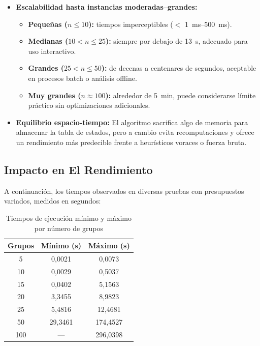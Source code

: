 \documentclass[11pt,letter]{article}
\begin{document}
\begin{itemize}
\begin{itemize}
    \item \textbf{Escalabilidad hasta instancias moderadas–grandes:}

        \begin{itemize}

          \item \textbf{Pequeñas ($n \leq 10$):}
          tiempos imperceptibles ($<$ 1~ms–500~ms).

          \item \textbf{Medianas ($10 < n \leq 25$):}
          siempre por debajo de 13~s, adecuado para uso interactivo.

          \item \textbf{Grandes ($25 < n \leq 50$):}
          de decenas a centenares de segundos, aceptable en procesos batch o análisis offline.

          \item \textbf{Muy grandes ($n \approx 100$):}
          alrededor de 5~min, puede considerarse límite práctico sin optimizaciones adicionales.

        \end{itemize}


    \item \textbf{Equilibrio espacio-tiempo:}
    El algoritmo sacrifica algo de memoria para almacenar la tabla de estados, pero a cambio evita recomputaciones y ofrece un rendimiento más predecible frente a heurísticos voraces o fuerza bruta.

    \end{itemize}


    \subsection{Impacto en El Rendimiento}
    A continuación, los tiempos observados en diversas pruebas con presupuestos variados, medidos en segundos:

        \begin{table}[h!]
    \centering
    \begin{tabular}{|c|c|c|}
    \hline
    \textbf{Grupos} & \textbf{Mínimo (s)} & \textbf{Máximo (s)} \\
    \hline
    5   & 0{,}0021 & 0{,}0073 \\
    10  & 0{,}0029 & 0{,}5037 \\
    15  & 0{,}0402 & 5{,}1563 \\
    20  & 3{,}3455 & 8{,}9823 \\
    25  & 5{,}4816 & 12{,}4681 \\
    50  & 29{,}3461 & 174{,}4527 \\
    100 & ---      & 296{,}0398 \\
    \hline
    \end{tabular}
    \caption{Tiempos de ejecución mínimo y máximo por número de grupos}
    \label{tab:tiempos-grupos}
        \end{table}



\end{itemize}
\end{document}
